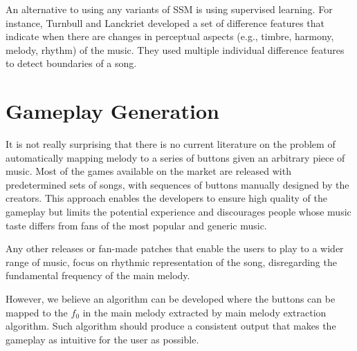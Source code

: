 An alternative to using any variants of SSM is using supervised learning. For instance, Turnbull and Lanckriet \cite{segmentsupervised} developed a set of difference features that indicate when there are changes in perceptual aspects (e.g., timbre, harmony, melody, rhythm) of the music. They used multiple individual difference features to detect boundaries of a song. 

\vspace{20pt}

\section{Gameplay Generation}

It is not really surprising that there is no current literature on the problem of automatically mapping melody to a series of buttons given an arbitrary piece of music. Most of the games available on the market are released with predetermined sets of songs, with sequences of buttons manually designed by the creators. This approach enables the developers to ensure high quality of the gameplay but limits the potential experience and discourages people whose music taste differs from fans of the most popular and generic music. 

Any other releases or fan-made patches that enable the users to play to a wider range of music, focus on rhythmic representation of the song, disregarding the fundamental frequency of the main melody.

However, we believe an algorithm can be developed where the buttons can be mapped to the $f_{0}$ in the main melody extracted by main melody extraction algorithm. Such algorithm should produce a consistent output that makes the gameplay as intuitive for the user as possible.